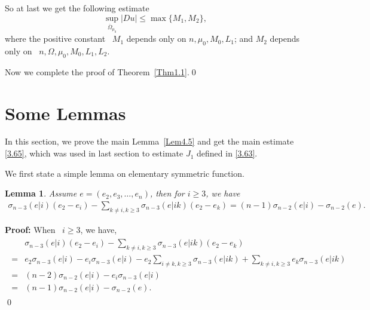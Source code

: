 \documentclass[11pt]{amsart}
\newtheorem{Lem}[Thm]{Lemma}
\numberwithin{equation}{section}
\begin{document}
So at last we get the following estimate
$$\sup_{\overline\Omega_{\mu_0}}|Du|\leq \max\{M_1, M_2\},$$
where the positive constant  ~$ M_1$ depends only on $n, \mu_0, M_0, L_1$; and $ M_2$ depends only on ~$n, \Omega, \mu_0, M_0, L_1, L_2$.

 Now we  complete the proof of Theorem~\ref{Thm1.1}.\qed

\section{ Some  Lemmas }
In this section, we prove the main Lemma~\ref{Lem4.5} and get the main estimate \eqref{3.65}, which was used in last section to estimate  $J_1$ defined in  \eqref{3.63}.


We first state a simple lemma on elementary symmetric function.
\begin{Lem}\label{Lem4.1}
Assume $e=(e_2, e_3,\ldots, e_n)$,  then for $i\geq 3$, we have
\begin{align}\label{lem4.1}
\sigma_{n-3}(e|i)(e_2-e_i)-\sum_{k\neq i, k\geq 3}\sigma_{n-3}(e|ik)(e_2-e_k)
=(n-1)\sigma_{n-2}(e|i)-\sigma_{n-2}(e).
\end{align}
\end{Lem}
{\bf Proof:}  When ~$i\geq 3$, we have,
\begin{align*}
\begin{split}
&\sigma_{n-3}(e|i)(e_2-e_i)-\sum_{k\neq i, k\geq 3}\sigma_{n-3}(e|ik)(e_2-e_k)\\
=&e_2\sigma_{n-3}(e|i)- e_i\sigma_{n-3}(e|i)-e_2\sum_{i\neq k, k\geq 3}\sigma_{n-3}(e|ik)+\sum_{k\neq i, k\geq 3}e_k\sigma_{n-3}(e|ik)\\
=&(n-2)\sigma_{n-2}(e|i)-e_i\sigma_{n-3}(e|i)\\
=&(n-1)\sigma_{n-2}(e|i)-\sigma_{n-2}(e).
\end{split}
\end{align*}
\qed
\end{document}
